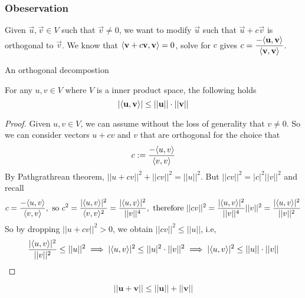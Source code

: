 \subsubsection*{Obeservation}
Given $\vec u,\vec v \in V$ such that $\vec v \neq 0$, we want to modify $\vec u$ such that $\vec u + c\vec v$ is orthogonal to $\vec v$. We know that $\langle \mathbf v + c\mathbf v, \mathbf v \rangle = 0$, solve for $c$ gives $c = \displaystyle\frac{-\langle \mathbf u, \mathbf v\rangle}{\langle \mathbf v, \mathbf v \rangle}$.
\begin{center}

    An orthogonal decompostion
\end{center}
\begin{theorem}
    For any $u,v \in V$ where $V$ is a inner product space, the following holds
    \[ |\langle \mathbf u,\mathbf v \rangle| \leq ||\mathbf u|| \cdot ||\mathbf v||\]
\end{theorem}
\begin{proof}
    Given $u,v \in V$, we can assume without the loss of generality that $v \neq 0$. So we can consider vectors $u + cv$ and $v$ that are orthogonal for the choice that 
    \[ c: = \frac{ - \langle u,v \rangle}{\langle v,v\rangle}\]
    By Pathgrathrean theorem, $||u + cv||^2 + ||cv||^2 = ||u||^2$. But $||cv||^2 = |c|^2||v||^2$ and recall \[ c= \frac{- \langle u,v\rangle}{\langle v,v\rangle}, \text{ so } c^2= \frac{|\langle u,v\rangle|^2}{\langle v,v\rangle^2} = \frac{|\langle u, v \rangle|^2}{||v||^4}, \text{ therefore } ||cv||^2 = \frac{|\langle u, v \rangle|^2}{||v||^4} ||v||^2 = \frac{|\langle u, v \rangle|^2}{||v||^2}\]
    So by dropping $|| u + cv||^2 > 0$, we obtain $||cv||^2 \leq ||u||$, i.e, 
    \[ \frac{|\langle u, v \rangle|^2}{||v||^2} \leq ||u||^2 \implies |\langle u,v\rangle|^2 \leq ||u|^2 \cdot ||v||^2 \implies |\langle u,v \rangle|^2 \leq ||u|| \cdot ||v||\]
\end{proof}
\begin{theorem}
\[ ||\mathbf u + \mathbf v|| \leq ||\mathbf u|| + ||\mathbf v||\]
\end{theorem}
